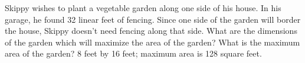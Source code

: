 {\label{fixedperimetermaxareagarden} Skippy wishes to plant a vegetable garden along one side of his house.  In his garage, he found 32 linear feet of fencing.  Since one side of the garden will border the house, Skippy doesn't need fencing along that side.  What are the dimensions of the garden which will maximize the area of the garden?  What is the maximum  area of the garden?}
{8 feet by 16 feet; maximum area is 128 square feet.}